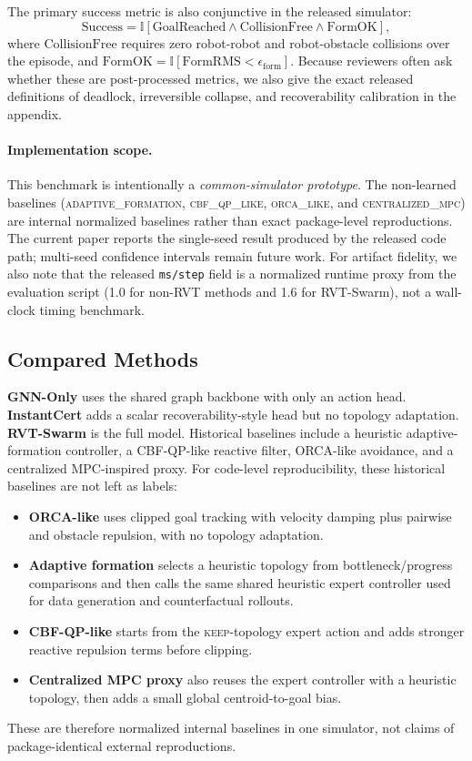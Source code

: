 \documentclass[journal]{IEEEtran}
\begin{document}
The primary success metric is also conjunctive in the released
simulator:
\begin{equation}
\mathrm{Success}
= \mathbb{I}[\mathrm{GoalReached}\wedge \mathrm{CollisionFree}\wedge \mathrm{FormOK}],
\label{eq:success_metric}
\end{equation}
where $\mathrm{CollisionFree}$ requires zero robot-robot and
robot-obstacle collisions over the episode, and
$\mathrm{FormOK}=\mathbb{I}[\mathrm{FormRMS}<\epsilon_{\mathrm{form}}]$.
Because reviewers often ask whether these are post-processed metrics, we
also give the exact released definitions of deadlock, irreversible
collapse, and recoverability calibration in the appendix.

\paragraph{Implementation scope.}
This benchmark is intentionally a \emph{common-simulator prototype}.
The non-learned baselines (\textsc{adaptive\_formation},
\textsc{cbf\_qp\_like}, \textsc{orca\_like}, and
\textsc{centralized\_mpc}) are internal normalized baselines rather than
exact package-level reproductions. The current paper reports the
single-seed result produced by the released code path; multi-seed
confidence intervals remain future work. For artifact fidelity, we also
note that the released \texttt{ms/step} field is a normalized runtime
proxy from the evaluation script (1.0 for non-RVT methods and 1.6 for
RVT-Swarm), not a wall-clock timing benchmark.

\subsection{Compared Methods}
\textbf{GNN-Only} uses the shared graph backbone with only an action
head. \textbf{InstantCert} adds a scalar recoverability-style head but
no topology adaptation. \textbf{RVT-Swarm} is the full model.
Historical baselines include a heuristic adaptive-formation controller,
a CBF-QP-like reactive filter, ORCA-like avoidance, and a centralized
MPC-inspired proxy. For code-level reproducibility, these historical
baselines are not left as labels:
\begin{itemize}
    \item \textbf{ORCA-like} uses
    clipped goal tracking with velocity damping plus pairwise and
    obstacle repulsion, with no topology adaptation.
    \item \textbf{Adaptive formation} selects a heuristic topology from
    bottleneck/progress comparisons and then calls the same shared
    heuristic expert controller used for data generation and
    counterfactual rollouts.
    \item \textbf{CBF-QP-like} starts from the \textsc{keep}-topology
    expert action and adds stronger reactive repulsion terms before
    clipping.
    \item \textbf{Centralized MPC proxy} also reuses the expert
    controller with a heuristic topology, then adds a small global
    centroid-to-goal bias.
\end{itemize}
These are therefore normalized internal baselines in one simulator, not
claims of package-identical external reproductions.
\end{document}
